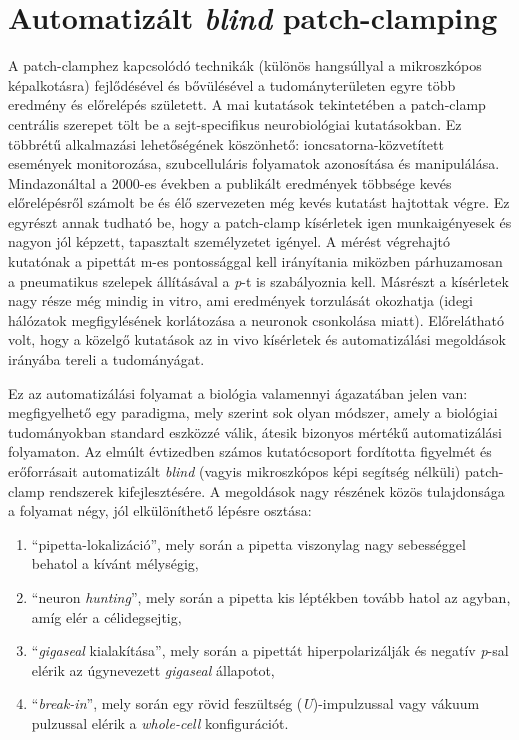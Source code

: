 \documentclass[12pt,a4paper]{report}
\begin{document}
\section*{Automatizált \textit{blind} patch-clamping}
A patch-clamphez kapcsolódó technikák (különös hangsúllyal a mikroszkópos képalkotásra) fejlődésével és bővülésével a tudományterületen egyre több eredmény és előrelépés született. A mai kutatások tekintetében a patch-clamp centrális szerepet tölt be a sejt-specifikus neurobiológiai kutatásokban. Ez többrétű alkalmazási lehetőségének köszönhető: ioncsatorna-közvetített események monitorozása, szubcelluláris folyamatok azonosítása és manipulálása. Mindazonáltal a 2000-es években a publikált eredmények többsége kevés előrelépésről számolt be és élő szervezeten még kevés kutatást hajtottak végre. Ez egyrészt annak tudható be, hogy a patch-clamp kísérletek igen munkaigényesek és nagyon jól képzett, tapasztalt személyzetet igényel. A mérést végrehajtó kutatónak a pipettát \textmu m-es pontossággal kell irányítania miközben párhuzamosan a pneumatikus szelepek állításával a \textit{p}-t is szabályoznia kell. Másrészt a kísérletek nagy része még mindig in vitro, ami eredmények torzulását okozhatja (idegi hálózatok megfigylésének korlátozása a neuronok csonkolása miatt). Előrelátható volt, hogy a közelgő kutatások az in vivo kísérletek és automatizálási megoldások irányába tereli a tudományágat.\par
Ez az automatizálási folyamat a biológia valamennyi ágazatában jelen van: megfigyelhető egy paradigma, mely szerint sok olyan módszer, amely a biológiai tudományokban standard eszközzé válik, átesik bizonyos mértékű automatizálási folyamaton. Az elmúlt évtizedben számos kutatócsoport fordította figyelmét és erőforrásait automatizált \textit{blind} (vagyis mikroszkópos képi segítség nélküli) patch-clamp rendszerek kifejlesztésére. A megoldások nagy részének közös tulajdonsága a folyamat négy, jól elkülöníthető lépésre osztása: %
\begin{enumerate}
    \item \enquote{pipetta-lokalizáció}, mely során a pipetta viszonylag nagy sebességgel behatol a kívánt mélységig,
    \item \enquote{neuron \textit{hunting}}, mely során a pipetta kis léptékben tovább hatol az agyban, amíg elér a célidegsejtig,
    \item \enquote{\textit{gigaseal} kialakítása}, mely során a pipettát hiperpolarizálják és negatív \textit{p}-sal elérik az úgynevezett \textit{gigaseal} állapotot,
    \item \enquote{\textit{break-in}}, mely során egy rövid feszültség (\textit{U})-impulzussal vagy vákuum pulzussal elérik a \textit{whole-cell} konfigurációt.
\end{enumerate}
\end{document}
